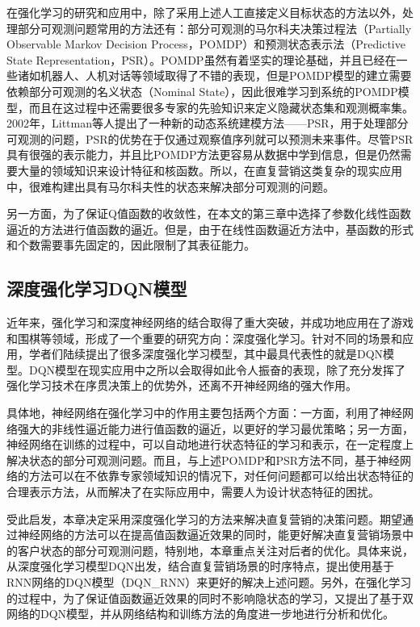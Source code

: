 在强化学习的研究和应用中，除了采用上述人工直接定义目标状态的方法以外，处理部分可观测问题常用的方法还有：部分可观测的马尔科夫决策过程法（Partially Observable Markov  Decision Process，POMDP）\citep{kaelbling1998planning}和预测状态表示法（Predictive State Representation，PSR）\citep{littman2002predictive}。POMDP虽然有着坚实的理论基础，并且已经在一些诸如机器人、人机对话等领域取得了不错的表现\citep{pineau2003point,williams2007partially}，但是POMDP模型的建立需要依赖部分可观测的名义状态（Nominal State），因此很难学习到系统的POMDP模型，而且在这过程中还需要很多专家的先验知识来定义隐藏状态集和观测概率集。2002年，Littman等人提出了一种新的动态系统建模方法——PSR\citep{littman2002predictive}，用于处理部分可观测的问题，PSR的优势在于仅通过观察值序列就可以预测未来事件。尽管PSR具有很强的表示能力，并且比POMDP方法更容易从数据中学到信息，但是仍然需要大量的领域知识来设计特征和核函数。所以，在直复营销这类复杂的现实应用中，很难构建出具有马尔科夫性的状态来解决部分可观测的问题。

另一方面，为了保证Q值函数的收敛性，在本文的第三章中选择了参数化线性函数逼近的方法进行值函数的逼近。但是，由于在线性函数逼近方法中，基函数的形式和个数需要事先固定的，因此限制了其表征能力。

\subsection{深度强化学习DQN模型}
近年来，强化学习和深度神经网络的结合取得了重大突破，并成功地应用在了游戏和围棋等领域\citep{mnih2013playing}，形成了一个重要的研究方向：深度强化学习。针对不同的场景和应用，学者们陆续提出了很多深度强化学习模型\citep{van2016deep,mnih2016asynchronous,lillicrap2015continuous}，其中最具代表性的就是DQN模型\citep{mnih2015human}。DQN模型在现实应用中之所以会取得如此令人振奋的表现，除了充分发挥了强化学习技术在序贯决策上的优势外，还离不开神经网络的强大作用。

具体地，神经网络在强化学习中的作用主要包括两个方面：一方面，利用了神经网络强大的非线性逼近能力进行值函数的逼近，以更好的学习最优策略；另一方面，神经网络在训练的过程中，可以自动地进行状态特征的学习和表示，在一定程度上解决状态的部分可观测问题。而且，与上述POMDP和PSR方法不同，基于神经网络的方法可以在不依靠专家领域知识的情况下，对任何问题都可以给出状态特征的合理表示方法\citep{deng2014deep}，从而解决了在实际应用中，需要人为设计状态特征的困扰。

受此启发，本章决定采用深度强化学习的方法来解决直复营销的决策问题。期望通过神经网络的方法可以在提高值函数逼近效果的同时，能更好解决直复营销场景中的客户状态的部分可观测问题，特别地，本章重点关注对后者的优化。具体来说，从深度强化学习模型DQN出发，结合直复营销场景的时序特点，提出使用基于RNN网络的DQN模型（DQN_RNN）来更好的解决上述问题。另外，在强化学习的过程中，为了保证值函数逼近效果的同时不影响隐状态的学习，又提出了基于双网络的DQN模型，并从网络结构和训练方法的角度进一步地进行分析和优化。

